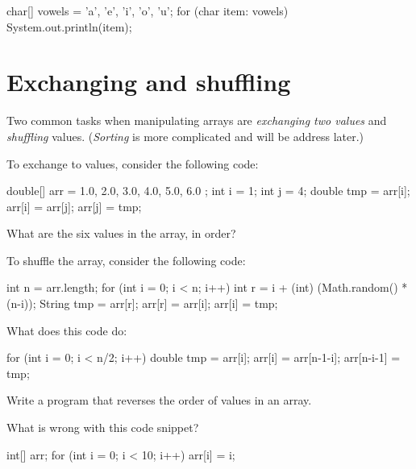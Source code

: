 \begin{code}
char[] vowels = {'a', 'e', 'i', 'o', 'u'};
for (char item: vowels) {
    System.out.println(item);
}
\end{code}

\section{Exchanging and shuffling}

Two common tasks when manipulating arrays are \emph{exchanging two values} and \emph{shuffling} values. (\emph{Sorting} is more complicated and will be address later.)

To exchange to values, consider the following code:

\begin{code}
double[] arr = { 1.0, 2.0, 3.0, 4.0, 5.0, 6.0 };
int i = 1;
int j = 4;
double tmp = arr[i]; 
arr[i] = arr[j]; 
arr[j] = tmp;
\end{code}

\begin{example}
What are the six values in the array, in order?
\end{example}

To shuffle the array, consider the following code:

\begin{code}
int n = arr.length; 
for (int i = 0; i < n; i++) { 
    int r = i + (int) (Math.random() * (n-i)); 
    String tmp = arr[r];
    arr[r] = arr[i];
    arr[i] = tmp;
}
\end{code}

\begin{example}
What does this code do:

\begin{code}
for (int i = 0; i < n/2; i++) {
    double tmp = arr[i];
    arr[i] = arr[n-1-i];
    arr[n-i-1] = tmp;
}
\end{code}
\end{example}

\exercisesection

\begin{exercise}
Write a program that reverses the order of values in an array.
\end{exercise}

\begin{exercise}
What is wrong with this code snippet?

\begin{code}
int[] arr;
for (int i = 0; i < 10; i++) {
    arr[i] = i;
}
\end{code}
\end{exercise}

